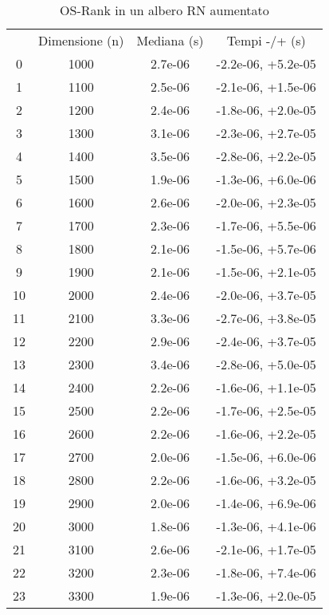 \begin{table}
\centering
\caption{OS-Rank in un albero RN aumentato}
\label{OS-Rank in un albero RN aumentato}
\begin{adjustbox}{width=1\textwidth/2}
\begin{tabular}{|c|c|c|c|}
\hline
 & Dimensione (n) & Mediana (s) & Tempi -/+ (s) \\
0 & 1000 & 2.7e-06 & -2.2e-06, +5.2e-05 \\
\cline{1-4}
1 & 1100 & 2.5e-06 & -2.1e-06, +1.5e-06 \\
\cline{1-4}
2 & 1200 & 2.4e-06 & -1.8e-06, +2.0e-05 \\
\cline{1-4}
3 & 1300 & 3.1e-06 & -2.3e-06, +2.7e-05 \\
\cline{1-4}
4 & 1400 & 3.5e-06 & -2.8e-06, +2.2e-05 \\
\cline{1-4}
5 & 1500 & 1.9e-06 & -1.3e-06, +6.0e-06 \\
\cline{1-4}
6 & 1600 & 2.6e-06 & -2.0e-06, +2.3e-05 \\
\cline{1-4}
7 & 1700 & 2.3e-06 & -1.7e-06, +5.5e-06 \\
\cline{1-4}
8 & 1800 & 2.1e-06 & -1.5e-06, +5.7e-06 \\
\cline{1-4}
9 & 1900 & 2.1e-06 & -1.5e-06, +2.1e-05 \\
\cline{1-4}
10 & 2000 & 2.4e-06 & -2.0e-06, +3.7e-05 \\
\cline{1-4}
11 & 2100 & 3.3e-06 & -2.7e-06, +3.8e-05 \\
\cline{1-4}
12 & 2200 & 2.9e-06 & -2.4e-06, +3.7e-05 \\
\cline{1-4}
13 & 2300 & 3.4e-06 & -2.8e-06, +5.0e-05 \\
\cline{1-4}
14 & 2400 & 2.2e-06 & -1.6e-06, +1.1e-05 \\
\cline{1-4}
15 & 2500 & 2.2e-06 & -1.7e-06, +2.5e-05 \\
\cline{1-4}
16 & 2600 & 2.2e-06 & -1.6e-06, +2.2e-05 \\
\cline{1-4}
17 & 2700 & 2.0e-06 & -1.5e-06, +6.0e-06 \\
\cline{1-4}
18 & 2800 & 2.2e-06 & -1.6e-06, +3.2e-05 \\
\cline{1-4}
19 & 2900 & 2.0e-06 & -1.4e-06, +6.9e-06 \\
\cline{1-4}
20 & 3000 & 1.8e-06 & -1.3e-06, +4.1e-06 \\
\cline{1-4}
21 & 3100 & 2.6e-06 & -2.1e-06, +1.7e-05 \\
\cline{1-4}
22 & 3200 & 2.3e-06 & -1.8e-06, +7.4e-06 \\
\cline{1-4}
23 & 3300 & 1.9e-06 & -1.3e-06, +2.0e-05 \\

\end{tabular}
\end{adjustbox}
\end{table}
